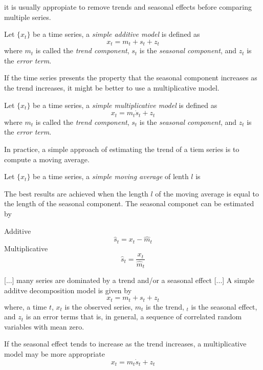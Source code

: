 {\color{red} it is usually appropiate to remove trends and seasonal effects before comparing multiple series.}

\begin{definition}
    Let $\{ x_t \}$ be a time series, a \emph{simple additive model} is defined as
    \[
        x_t = m_t + s_t + z_t
    \]
    where $m_t$ is called the \emph{trend component}, $s_t$ is the \emph{seasonal component}, and $z_t$ is the \emph{error term}.
\end{definition}

If the time series presents the property that the seasonal component increases as the trend increases, it might be better to use a multiplicative model.

\begin{definition}
    Let $\{ x_t \}$ be a time series, a \emph{simple multiplicative model} is defined as
    \[
        x_t = m_t \dot s_t + z_t
    \]
    where $m_t$ is called the \emph{trend component}, $s_t$ is the \emph{seasonal component}, and $z_t$ is the \emph{error term}.
\end{definition}

In practice, a simple approach of estimating the trend of a tiem series is to compute a moving average.

\begin{definition}
    Let $\{ x_t \}$ be a time series, a \emph{simple moving average} of lenth $l$ is 
\end{definition}

The best results are achieved when the length $l$ of the moving average is equal to the length of the seasonal component. The seasonal componet can be estimated by

\begin{definition}
    Additive
    \[
        \hat{s}_t = x_t - \hat{m}_t
    \]
    Multiplicative
    \[
        \hat{s}_t = \frac{x_t}{\hat{m}_t}
    \]
\end{definition}


{\color{red} [...] many series are dominated by a trend and/or a seasonal effect [...] A simple additve decomposition model is given by
\[
    x_t = m_t + s_t + z_t
\]
where, a time $t$, $x_t$ is the observed series, $m_t$ is the trend, $_t$ is the seasonal effect, and $z_t$ is an error terms that is, in general, a sequence of correlated random variables with mean zero.

If the seasonal effect tends to increase as the trend increases, a multiplicative model may be more appropriate
\[
    x_t = m_t \dot s_t + z_t
\]

}

